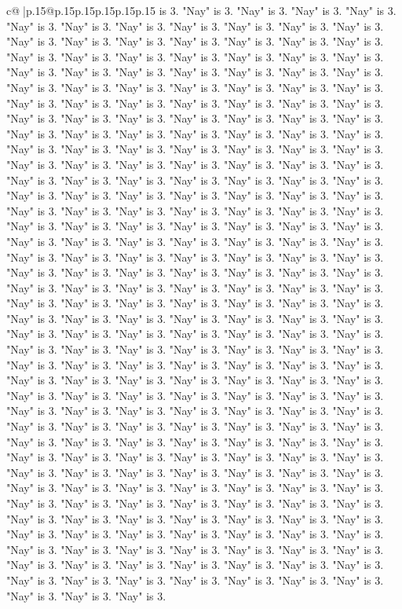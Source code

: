 \documentclass{article}
\begin{document}
{\begin{supertabular}{c@{$\;$}|p{.15\linewidth}@{}p{.15\linewidth}p{.15\linewidth}p{.15\linewidth}p{.15\linewidth}p{.15\linewidth}}
{{{is 3. "Nay" is 3. "Nay" is 3. "Nay" is 3. "Nay" is 3. "Nay" is 3. "Nay" is 3. "Nay" is 3. "Nay" is 3. "Nay" is 3. "Nay" is 3. "Nay" is 3. "Nay" is 3. "Nay" is 3. "Nay" is 3. "Nay" is 3. "Nay" is 3. "Nay" is 3. "Nay" is 3. "Nay" is 3. "Nay" is 3. "Nay" is 3. "Nay" is 3. "Nay" is 3. "Nay" is 3. "Nay" is 3. "Nay" is 3. "Nay" is 3. "Nay" is 3. "Nay" is 3. "Nay" is 3. "Nay" is 3. "Nay" is 3. "Nay" is 3. "Nay" is 3. "Nay" is 3. "Nay" is 3. "Nay" is 3. "Nay" is 3. "Nay" is 3. "Nay" is 3. "Nay" is 3. "Nay" is 3. "Nay" is 3. "Nay" is 3. "Nay" is 3. "Nay" is 3. "Nay" is 3. "Nay" is 3. "Nay" is 3. "Nay" is 3. "Nay" is 3. "Nay" is 3. "Nay" is 3. "Nay" is 3. "Nay" is 3. "Nay" is 3. "Nay" is 3. "Nay" is 3. "Nay" is 3. "Nay" is 3. "Nay" is 3. "Nay" is 3. "Nay" is 3. "Nay" is 3. "Nay" is 3. "Nay" is 3. "Nay" is 3. "Nay" is 3. "Nay" is 3. "Nay" is 3. "Nay" is 3. "Nay" is 3. "Nay" is 3. "Nay" is 3. "Nay" is 3. "Nay" is 3. "Nay" is 3. "Nay" is 3. "Nay" is 3. "Nay" is 3. "Nay" is 3. "Nay" is 3. "Nay" is 3. "Nay" is 3. "Nay" is 3. "Nay" is 3. "Nay" is 3. "Nay" is 3. "Nay" is 3. "Nay" is 3. "Nay" is 3. "Nay" is 3. "Nay" is 3. "Nay" is 3. "Nay" is 3. "Nay" is 3. "Nay" is 3. "Nay" is 3. "Nay" is 3. "Nay" is 3. "Nay" is 3. "Nay" is 3. "Nay" is 3. "Nay" is 3. "Nay" is 3. "Nay" is 3. "Nay" is 3. "Nay" is 3. "Nay" is 3. "Nay" is 3. "Nay" is 3. "Nay" is 3. "Nay" is 3. "Nay" is 3. "Nay" is 3. "Nay" is 3. "Nay" is 3. "Nay" is 3. "Nay" is 3. "Nay" is 3. "Nay" is 3. "Nay" is 3. "Nay" is 3. "Nay" is 3. "Nay" is 3. "Nay" is 3. "Nay" is 3. "Nay" is 3. "Nay" is 3. "Nay" is 3. "Nay" is 3. "Nay" is 3. "Nay" is 3. "Nay" is 3. "Nay" is 3. "Nay" is 3. "Nay" is 3. "Nay" is 3. "Nay" is 3. "Nay" is 3. "Nay" is 3. "Nay" is 3. "Nay" is 3. "Nay" is 3. "Nay" is 3. "Nay" is 3. "Nay" is 3. "Nay" is 3. "Nay" is 3. "Nay" is 3. "Nay" is 3. "Nay" is 3. "Nay" is 3. "Nay" is 3. "Nay" is 3. "Nay" is 3. "Nay" is 3. "Nay" is 3. "Nay" is 3. "Nay" is 3. "Nay" is 3. "Nay" is 3. "Nay" is 3. "Nay" is 3. "Nay" is 3. "Nay" is 3. "Nay" is 3. "Nay" is 3. "Nay" is 3. "Nay" is 3. "Nay" is 3. "Nay" is 3. "Nay" is 3. "Nay" is 3. "Nay" is 3. "Nay" is 3. "Nay" is 3. "Nay" is 3. "Nay" is 3. "Nay" is 3. "Nay" is 3. "Nay" is 3. "Nay" is 3. "Nay" is 3. "Nay" is 3. "Nay" is 3. "Nay" is 3. "Nay" is 3. "Nay" is 3. "Nay" is 3. "Nay" is 3. "Nay" is 3. "Nay" is 3. "Nay" is 3. "Nay" is 3. "Nay" is 3. "Nay" is 3. "Nay" is 3. "Nay" is 3. "Nay" is 3. "Nay" is 3. "Nay" is 3. "Nay" is 3. "Nay" is 3. "Nay" is 3. "Nay" is 3. "Nay" is 3. "Nay" is 3. "Nay" is 3. "Nay" is 3. "Nay" is 3. "Nay" is 3. "Nay" is 3. "Nay" is 3. "Nay" is 3. "Nay" is 3. "Nay" is 3. "Nay" is 3. "Nay" is 3. "Nay" is 3. "Nay" is 3. "Nay" is 3. "Nay" is 3. "Nay" is 3. "Nay" is 3. "Nay" is 3. "Nay" is 3. "Nay" is 3. "Nay" is 3. "Nay" is 3. "Nay" is 3. "Nay" is 3. "Nay" is 3. "Nay" is 3. "Nay" is 3. "Nay" is 3. "Nay" is 3. "Nay" is 3. "Nay" is 3. "Nay" is 3. "Nay" is 3. "Nay" is 3. "Nay" is 3. "Nay" is 3. "Nay" is 3. "Nay" is 3. "Nay" is 3. "Nay" is 3. "Nay" is 3. "Nay" is 3. "Nay" is 3. "Nay" is 3. "Nay" is 3. "Nay" is 3. "Nay" is 3. "Nay" is 3. "Nay" is 3. "Nay" is 3. "Nay" is 3. "Nay" is 3. "Nay" is 3. "Nay" is 3. "Nay" is 3. "Nay" is 3. "Nay" is 3. "Nay" is 3. }}}
\end{supertabular}}
\end{document}
